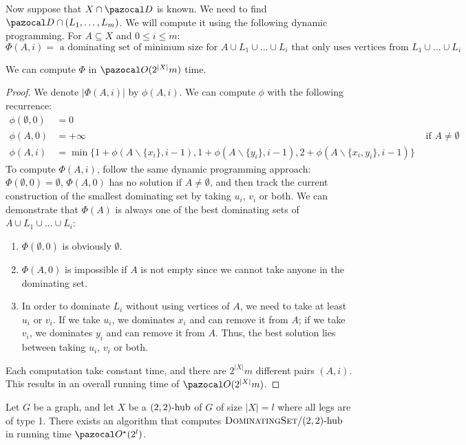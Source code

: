 Now suppose that $X \cap \D$ is known. We need to find $\D \cap (L_1, \dots, L_m)$. We will compute it using the following dynamic programming. For $A \subseteq X$ and $0 \leq i \leq m$:
$$\Phi(A, i) = \text{ a dominating set of minimum size for $A \cup L_1 \cup \dots \cup L_i$ that only uses vertices from $L_1 \cup \dots \cup L_i$}.$$

\begin{lemma}
    \label{lemma:domset-phi}
    We can compute $\Phi$ in $\O(2^{|X|}m)$ time.
\end{lemma}

\begin{proof}
    We denote $|\Phi(A, i)|$ by $\phi(A, i)$. We can compute $\phi$ with the following recurrence:
    \begin{align}
        \phi(\emptyset, 0) &= 0\\
        \phi(A, 0) &= +\infty & \text{ if } A \neq \emptyset\\
        \phi(A, i) &= \min\{1 + \phi(A \backslash \{x_i\}, i-1), 1 + \phi(A \backslash \{y_i\}, i-1), 2 + \phi(A \backslash \{x_i, y_i\}, i-1)\}
    \end{align}
    To compute $\Phi(A, i)$, follow the same dynamic programming approach: $\Phi(\emptyset, 0) = \emptyset$, $\Phi(A, 0)$ has no solution if $A \neq \emptyset$, and then track the current construction of the smallest dominating set by taking $u_i$, $v_i$ or both. We can demonstrate that $\Phi(A)$ is always one of the best dominating sets of $A \cup L_1 \cup \dots \cup L_i$:
    \begin{enumerate}
        \item $\Phi(\emptyset, 0)$ is obviously $\emptyset$.
        \item $\Phi(A, 0)$ is impossible if $A$ is not empty since we cannot take anyone in the dominating set.
        \item In order to dominate $L_i$ without using vertices of $A$, we need to take at least $u_i$ or $v_i$. If we take $u_i$, we dominates $x_i$ and can remove it from $A$; if we take $v_i$, we dominates $y_i$ and can remove it from $A$. Thus, the best solution lies between taking $u_i$, $v_i$ or both.
    \end{enumerate}
    Each computation take constant time, and there are $2^{|X|}m$ different pairs $(A, i)$. This results in an overall running time of $\O(2^{|X|}m)$.
\end{proof}

\begin{theorem}
    \label{theorem:domset-22-type1}
    Let $G$ be a graph, and let $X$ be a $\sdhub[2,2]$ of $G$ of size $|X| = l$ where all legs are of type 1. There exists an algorithm that computes $\prob{DominatingSet}/\sdhub[2,2]$ in running time $\O^\star(2^l)$.
\end{theorem}

